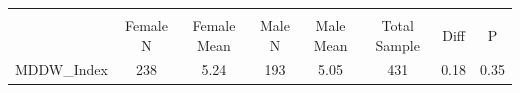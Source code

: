 {
\def\sym#1{\ifmmode^{#1}\else\(^{#1}\)\fi}
\begin{tabular}{l*{1}{ccccccc}}
\toprule
                    &\multicolumn{7}{c}{}                                                                      \\
                    &    Female N& Female Mean&      Male N&   Male Mean&Total Sample&        Diff&           P\\
\midrule
MDDW\_Index          &         238&        5.24&         193&        5.05&         431&        0.18&        0.35\\
\bottomrule
\end{tabular}
}

